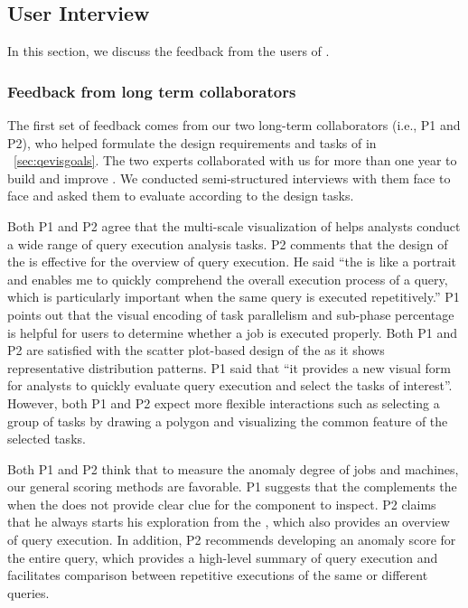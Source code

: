 \subsection{User Interview} \label{sec:user}

In this section, we discuss the feedback from the users of \qevis{}. 

\subsubsection{Feedback from long term collaborators}
The first set of feedback comes from our two long-term collaborators (i.e., P1 and P2), who helped formulate the design requirements and tasks of \qevis{} in ~\autoref{sec:qevisgoals}. The two experts collaborated with us for more than one year to build and improve \qevis{}. We conducted semi-structured interviews with them face to face and asked them to evaluate \qevis{} according to the design tasks. 

Both P1 and P2 agree that the multi-scale visualization of \qevis{} helps analysts conduct  a wide range of query execution analysis tasks. P2 comments that the design of the  is effective for the overview of query execution. He said ``the  is like a portrait and enables me to quickly comprehend the overall execution process of a query, which is particularly important when the same query is executed repetitively.'' P1 points out that the visual encoding of task parallelism and sub-phase percentage is helpful for users to determine whether a job is executed properly. Both P1 and P2 are satisfied with the scatter plot-based design of the  as it shows representative distribution patterns. P1 said that ``it provides a new visual form for analysts to quickly evaluate query execution and select the tasks of interest''. However, both P1 and P2 expect more flexible interactions such as selecting a group of tasks by drawing a polygon and visualizing the common feature of the selected tasks.

Both P1 and P2 think that to measure the anomaly degree of jobs and machines, our general scoring methods are favorable. P1 suggests that the  complements the  when the  does not provide clear clue for the component to inspect. P2 claims that he always starts his exploration from the , which also provides an overview of query execution. 
In addition, P2 recommends developing an anomaly score for the entire query, which provides a high-level summary of query execution and facilitates comparison between repetitive executions of the same or different queries.

